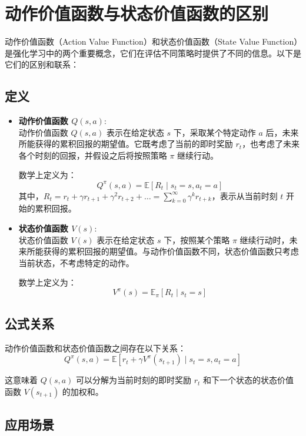 \documentclass[twocolumn, 10pt]{article} %
\theoremstyle{remark}
\begin{document}
\section{动作价值函数与状态价值函数的区别}

动作价值函数（Action Value Function）和状态价值函数（State Value Function）是强化学习中的两个重要概念，它们在评估不同策略时提供了不同的信息。以下是它们的区别和联系：

\subsection{定义}

\begin{itemize}
    \item \textbf{动作价值函数 $Q(s, a)$}: \\
    动作价值函数 \(Q(s, a)\) 表示在给定状态 \(s\) 下，采取某个特定动作 \(a\) 后，未来所能获得的累积回报的期望值。它既考虑了当前的即时奖励 \(r_t\)，也考虑了未来各个时刻的回报，并假设之后将按照策略 \(\pi\) 继续行动。

    数学上定义为：
    $$
    Q^\pi(s, a) = \mathbb{E} \left[ R_t \mid s_t = s, a_t = a \right]
    $$
    其中，$ R_t = r_t + \gamma r_{t+1} + \gamma^2 r_{t+2} + \dots = \sum_{k=0}^{\infty} \gamma^k r_{t+k} $，表示从当前时刻 \(t\) 开始的累积回报。

    \item \textbf{状态价值函数 \(V(s)\)}: \\
    状态价值函数 \(V(s)\) 表示在给定状态 \(s\) 下，按照某个策略 \(\pi\) 继续行动时，未来所能获得的累积回报的期望值。与动作价值函数不同，状态价值函数只考虑当前状态，不考虑特定的动作。

    数学上定义为：
    $$
    V^\pi(s) = \mathbb{E}_\pi \left[ R_t \mid s_t = s \right]
    $$
\end{itemize}

\subsection{公式关系}
 动作价值函数和状态价值函数之间存在以下关系：
$$
Q^\pi(s, a) = \mathbb{E} \left[ r_t + \gamma V^\pi(s_{t+1}) \mid s_t = s, a_t = a \right]
$$


这意味着 \(Q(s, a)\) 可以分解为当前时刻的即时奖励 \(r_t\) 和下一个状态的状态价值函数 \(V(s_{t+1})\) 的加权和。

\subsection{应用场景}
\end{document}

